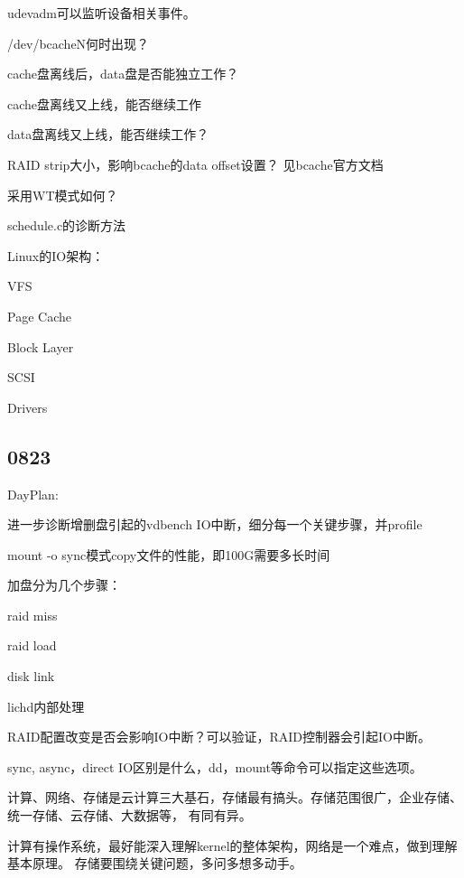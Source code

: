 udevadm可以监听设备相关事件。

\begin{enumbox}
\item /dev/bcacheN何时出现？
\item cache盘离线后，data盘是否能独立工作？
\item cache盘离线又上线，能否继续工作
\item data盘离线又上线，能否继续工作？
\item RAID strip大小，影响bcache的data offset设置？ 见bcache官方文档
\item 采用WT模式如何？
\item schedule.c的诊断方法
\end{enumbox}

Linux的IO架构：
\begin{enumbox}
\item VFS
\item Page Cache
\item Block Layer
\item SCSI
\item Drivers
\end{enumbox}

\subsection{0823}

DayPlan:
\begin{enumbox}
\item 进一步诊断增删盘引起的vdbench IO中断，细分每一个关键步骤，并profile
\item mount -o sync模式copy文件的性能，即100G需要多长时间
\end{enumbox}

加盘分为几个步骤：
\begin{enumbox}
\item raid miss
\item raid load
\item disk link
\item lichd内部处理
\end{enumbox}

RAID配置改变是否会影响IO中断？可以验证，RAID控制器会引起IO中断。

sync, async，direct IO区别是什么，dd，mount等命令可以指定这些选项。

计算、网络、存储是云计算三大基石，存储最有搞头。存储范围很广，企业存储、统一存储、云存储、大数据等，
有同有异。

计算有操作系统，最好能深入理解kernel的整体架构，网络是一个难点，做到理解基本原理。
存储要围绕关键问题，多问多想多动手。

